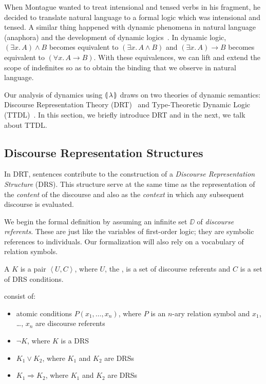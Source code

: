 When Montague wanted to treat intensional and tensed verbs in his fragment,
he decided to translate natural language to a formal logic which was
intensional and tensed. A similar thing happened with dynamic phenomena in
natural language (anaphora) and the development of dynamic
logics~\cite{groenendijk1991dynamic,kamp1993discourse,de2006towards}. In
dynamic logic, $(\exists x.\, A) \land B$ becomes equivalent to
$(\exists x.\, A \land B)$ and $(\exists x.\, A) \to B$ becomes equivalent
to $(\forall x.\, A \to B)$. With these equivalences, we can lift and
extend the scope of indefinites so as to obtain the binding that we observe
in natural language.

Our analysis of dynamics using ${\llparenthesis \, \lambda \, \rrparenthesis}$ draws on two theories of dynamic
semantics: Discourse Representation Theory (DRT)~\cite{kamp1993discourse}
and Type-Theoretic Dynamic Logic (TTDL)~\cite{de2006towards}. In this
section, we briefly introduce DRT and in the next, we talk about TTDL.


\subsection{Discourse Representation Structures}
\label{sec:drt-drses}

In DRT, sentences contribute to the construction of a \emph{Discourse
  Representation Structure} (DRS). This structure serve at the same time as
the representation of the \emph{content} of the discourse and also as the
\emph{context} in which any subsequent discourse is evaluated.

We begin the formal definition by assuming an infinite set $\DD$ of
\emph{discourse referents}. These are just like the variables of
first-order logic; they are symbolic references to individuals. Our
formalization will also rely on a vocabulary of relation symbols.

\begin{definition}
  A  $K$ is a pair
  $\left< U, C \right>$, where $U$, the , is a set of
  discourse referents and $C$ is a set of DRS conditions.

   consist of:
  \begin{itemize}
  \item atomic conditions $P(x_1, \ldots, x_n)$, where $P$ is an $n$-ary
    relation symbol and $x_1$, \ldots, $x_n$ are discourse referents
  \item $\lnot K$, where $K$ is a DRS
  \item $K_1 \lor K_2$, where $K_1$ and $K_2$ are DRSs
  \item $K_1 \Rightarrow K_2$, where $K_1$ and $K_2$ are DRSs
  \end{itemize}
\end{definition}

